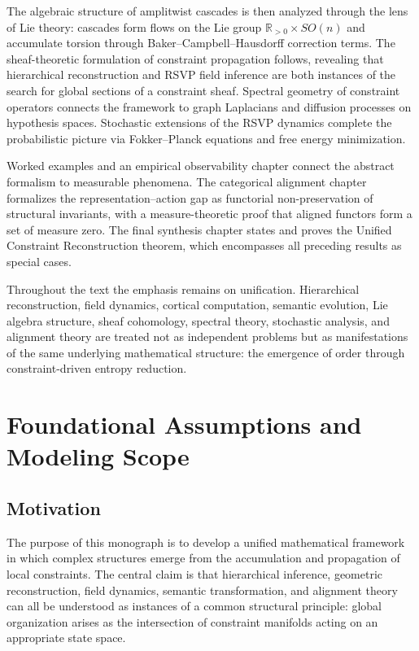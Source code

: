 \documentclass[12pt,a4paper,oneside]{book}
\numberwithin{equation}{chapter}
\theoremstyle{plain}
\theoremstyle{definition}
\theoremstyle{remark}
\begin{document}
The algebraic structure of amplitwist cascades is then analyzed
through the lens of Lie theory: cascades form flows on the Lie group
$\mathbb{R}_{>0} \times SO(n)$ and accumulate torsion through
Baker--Campbell--Hausdorff correction terms. The sheaf-theoretic
formulation of constraint propagation follows, revealing that
hierarchical reconstruction and RSVP field inference are both
instances of the search for global sections of a constraint sheaf.
Spectral geometry of constraint operators connects the framework to
graph Laplacians and diffusion processes on hypothesis spaces.
Stochastic extensions of the RSVP dynamics complete the probabilistic
picture via Fokker--Planck equations and free energy minimization.

Worked examples and an empirical observability chapter connect the
abstract formalism to measurable phenomena. The categorical alignment
chapter formalizes the representation--action gap as functorial
non-preservation of structural invariants, with a measure-theoretic
proof that aligned functors form a set of measure zero. The final
synthesis chapter states and proves the Unified Constraint
Reconstruction theorem, which encompasses all preceding results as
special cases.

Throughout the text the emphasis remains on unification. Hierarchical
reconstruction, field dynamics, cortical computation, semantic
evolution, Lie algebra structure, sheaf cohomology, spectral theory,
stochastic analysis, and alignment theory are treated not as
independent problems but as manifestations of the same underlying
mathematical structure: the emergence of order through
constraint-driven entropy reduction.

\tableofcontents

\mainmatter


\chapter{Foundational Assumptions and Modeling Scope}
\label{ch:foundations}

\section{Motivation}

The purpose of this monograph is to develop a unified mathematical
framework in which complex structures emerge from the accumulation and
propagation of local constraints. The central claim is that
hierarchical inference, geometric reconstruction, field dynamics,
semantic transformation, and alignment theory can all be understood
as instances of a common structural principle: global organization
arises as the intersection of constraint manifolds acting on an
appropriate state space.
\end{document}
